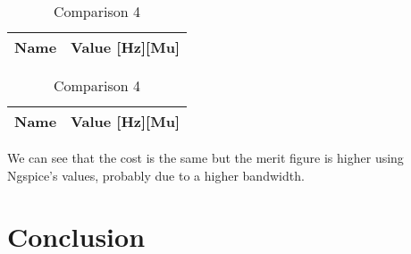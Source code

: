 \begin{table}[h]
\begin{center}
  \begin{tabular}{|c|c|}
    \hline    
    {\bf Name} & {\bf Value [Hz][Mu]} \\ \hline
    
    \hline
  \end{tabular}
  \begin{tabular}{|c||c|}
    \hline    
    {\bf Name} & {\bf Value [Hz][Mu]} \\ \hline
    
    \hline
  \end{tabular}
  \caption{Comparison 4}
  \label{tab:comparison 4}
\end{center}
\end{table}
\FloatBarrier


We can see that the cost is the same but the merit figure is higher using Ngspice's values, probably due to a higher bandwidth.

\section{Conclusion}
\label{sec:conclusion}


 




